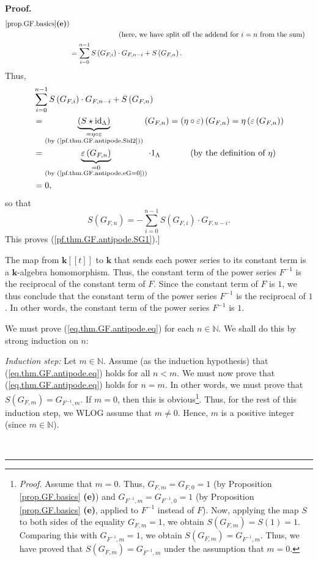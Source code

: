 \documentclass[numbers=enddot,12pt,final,onecolumn,notitlepage]{scrartcl}%
\theoremstyle{definition}
\newenvironment{proof}[1][Proof]{\noindent\textbf{#1.} }{\ \rule{0.5em}{0.5em}}
\let\sumnonlimits\sum
\renewcommand{\sum}{\sumnonlimits\limits}
\newenvironment{verlong}{}{}
\begin{document}
\begin{verlong}
\begin{proof}
\begin{align*}
{{{\ref{prop.GF.basics} \textbf{(e)})}}}\\
&  \ \ \ \ \ \ \ \ \ \ \ \ \ \ \ \ \ \ \ \ \left(  \text{here, we have split
off the addend for }i=n\text{ from the sum}\right) \\
&  =\sum_{i=0}^{n-1}S\left(  G_{F,i}\right)  \cdot G_{F,n-i}+S\left(
G_{F,n}\right)  .
\end{align*}
Thus,%
\begin{align*}
&  \sum_{i=0}^{n-1}S\left(  G_{F,i}\right)  \cdot G_{F,n-i}+S\left(
G_{F,n}\right) \\
&  =\underbrace{\left(  S\star\operatorname*{id}\nolimits_{\Lambda}\right)
}_{\substack{=\eta\circ\varepsilon\\\text{(by (\ref{pf.thm.GF.antipode.Sid2}%
))}}}\left(  G_{F,n}\right)  =\left(  \eta\circ\varepsilon\right)  \left(
G_{F,n}\right)  =\eta\left(  \varepsilon\left(  G_{F,n}\right)  \right) \\
&  =\underbrace{\varepsilon\left(  G_{F,n}\right)  }_{\substack{=0\\\text{(by
(\ref{pf.thm.GF.antipode.eG=0}))}}}\cdot1_{\Lambda}\ \ \ \ \ \ \ \ \ \ \left(
\text{by the definition of }\eta\right) \\
&  =0,
\end{align*}
so that%
\[
S\left(  G_{F,n}\right)  =-\sum_{i=0}^{n-1}S\left(  G_{F,i}\right)  \cdot
G_{F,n-i}.
\]
This proves (\ref{pf.thm.GF.antipode.SG1}).]

The map from $\mathbf{k}\left[  \left[  t\right]  \right]  $ to $\mathbf{k}$
that sends each power series to its constant term is a $\mathbf{k}$-algebra
homomorphism. Thus, the constant term of the power series $F^{-1}$ is the
reciprocal of the constant term of $F$. Since the constant term of $F$ is $1$,
we thus conclude that the constant term of the power series $F^{-1}$ is the
reciprocal of $1$. In other words, the constant term of the power series
$F^{-1}$ is $1$.

We must prove (\ref{eq.thm.GF.antipode.eq}) for each $n\in\mathbb{N}$. We
shall do this by strong induction on $n$:

\textit{Induction step:} Let $m\in\mathbb{N}$. Assume (as the induction
hypothesis) that (\ref{eq.thm.GF.antipode.eq}) holds for all $n<m$. We must
now prove that (\ref{eq.thm.GF.antipode.eq}) holds for $n=m$. In other words,
we must prove that $S\left(  G_{F,m}\right)  =G_{F^{-1},m}$. If $m=0$, then
this is obvious\footnote{\textit{Proof.} Assume that $m=0$. Thus,
$G_{F,m}=G_{F,0}=1$ (by Proposition \ref{prop.GF.basics} \textbf{(e)}) and
$G_{F^{-1},m}=G_{F^{-1},0}=1$ (by Proposition \ref{prop.GF.basics}
\textbf{(e)}, applied to $F^{-1}$ instead of $F$). Now, applying the map $S$
to both sides of the equality $G_{F,m}=1$, we obtain $S\left(  G_{F,m}\right)
=S\left(  1\right)  =1$. Comparing this with $G_{F^{-1},m}=1$, we obtain
$S\left(  G_{F,m}\right)  =G_{F^{-1},m}$. Thus, we have proved that $S\left(
G_{F,m}\right)  =G_{F^{-1},m}$ under the assumption that $m=0$.}. Thus, for
the rest of this induction step, we WLOG assume that $m\neq0$. Hence, $m$ is a
positive integer (since $m\in\mathbb{N}$).


\end{proof}
\end{verlong}
\end{document}
